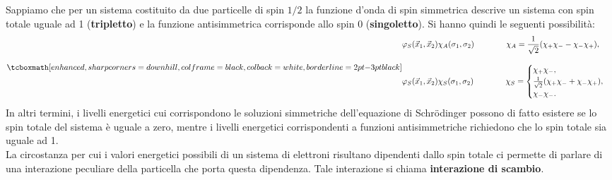\documentclass[a4paper,12pt,oneside]{book}
\begin{document}
Sappiamo che per un sistema costituito da due particelle di spin $1/2$ la funzione d'onda di spin simmetrica descrive un sistema con spin totale uguale ad 1 (\textbf{tripletto}) e la funzione antisimmetrica corrisponde allo spin 0 (\textbf{singoletto}). Si hanno quindi le seguenti possibilità:
	\begin{equation}
		\tcboxmath[enhanced, sharp corners=downhill, colframe=black, colback=white, borderline={2pt}{-3pt}{black}]{
		\begin{aligned}
			& \varphi_S(\vec{x}_1,\vec{x}_2)\chi_A(\sigma_1,\sigma_2)\qquad \qquad \chi_A=\frac{1}{\sqrt{2}}(\chi_+\chi_--\chi_-\chi_+) , \\[0.3cm]
			& \varphi_S(\vec{x}_1,\vec{x}_2)\chi_S(\sigma_1,\sigma_2)\qquad \qquad \chi_S=
			\begin{cases}
			\chi_+\chi_- , \\
			\frac{1}{\sqrt{2}}(\chi_+\chi_-+\chi_-\chi_+), \\
			\chi_-\chi_-.
			\end{cases}
			\end{aligned}
		} 
	\end{equation}
In altri termini, i livelli energetici cui corrispondono le soluzioni simmetriche dell'equazione di Schr\"{o}dinger possono di fatto esistere se lo spin totale del sistema è uguale a zero, mentre i livelli energetici corrispondenti a funzioni antisimmetriche richiedono che lo spin totale sia uguale ad 1.\\

La circostanza per cui i valori energetici possibili di un sistema di elettroni risultano dipendenti dallo spin totale ci permette di parlare di una interazione peculiare della particella che porta questa dipendenza. Tale interazione si chiama \textbf{interazione di scambio}.
\end{document}
